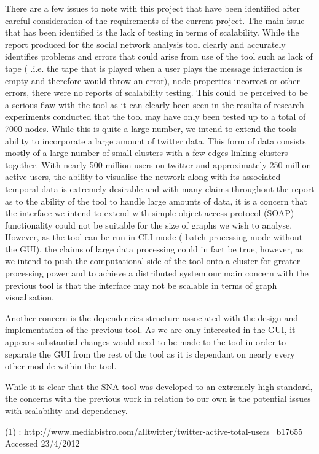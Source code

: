 There are a few issues to note with this project that have been identified after careful consideration of the requirements of the current project. The main issue that has been identified is the lack of testing in terms of scalability. While the report produced for the social network analysis tool clearly and accurately identifies problems and errors that could arise from use of the tool such as lack of tape ( .i.e. the tape that is played when a user plays the message interaction is empty and therefore would throw an error), node properties incorrect or other errors, there were no reports of scalability testing. This could be perceived to be a serious flaw with the tool as it can clearly been seen in the results of research experiments conducted that the tool may have only been tested up to a total of 7000 nodes. While this is quite a large number, we intend to extend the tools ability to incorporate a large amount of twitter data. This form of data consists mostly of a large number of small clusters with a few edges linking clusters together. With nearly 500 million users on twitter and approximately 250 million active users, the ability to visualise the network along with its associated temporal data is extremely desirable and with many claims throughout the report as to the ability of the tool to handle large amounts of data, it is a concern that the interface we intend to extend with simple object access protocol (SOAP) functionality could not be suitable for the size of graphs we wish to analyse. However, as the tool can be run in CLI mode ( batch processing mode without the GUI), the claims of large data processing could in fact be true, however, as we intend to push the computational side of the tool onto a cluster for greater processing power and to achieve a distributed system our main concern with the previous tool is that the interface may not be scalable in terms of graph visualisation. 

Another concern is the dependencies structure associated with the design and implementation of the previous tool. As we are only interested in the GUI, it appears substantial changes would need to be made to the tool in order to separate the GUI from the rest of the tool as it is dependant on nearly every other module within the tool. 

While it is clear that the SNA tool was developed to an extremely high standard, the concerns with the previous work in relation to our own is the potential issues with scalability and dependency.

(1) : http://www.mediabistro.com/alltwitter/twitter-active-total-users\_b17655 Accessed 23/4/2012